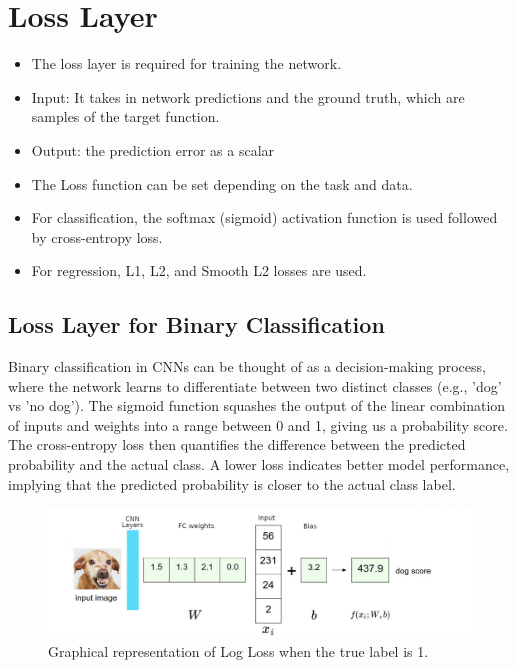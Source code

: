 \section{Loss Layer}
\begin{itemize}
    \item The loss layer is required for training the network.
    \item Input: It takes in network predictions and the ground truth, which are samples of the target function.
    \item Output: the prediction error as a scalar
    \item The Loss function can be set depending on the task and data. 
    \item For classification, the softmax (sigmoid) activation function is used followed by cross-entropy loss.
    \item For regression, L1, L2, and Smooth L2 losses are used.
\end{itemize}

\subsection*{Loss Layer for Binary Classification}

Binary classification in CNNs can be thought of as a decision-making process, where the network learns to differentiate between two distinct classes (e.g., 'dog' vs 'no dog'). The sigmoid function squashes the output of the linear combination of inputs and weights into a range between 0 and 1, giving us a probability score. The cross-entropy loss then quantifies the difference between the predicted probability and the actual class. A lower loss indicates better model performance, implying that the predicted probability is closer to the actual class label.


\begin{figure}[H]
    \centering
    \includegraphics[width=0.6\linewidth]{img/dogloss.png}
    \caption{Graphical representation of Log Loss when the true label is 1.}
\end{figure}


